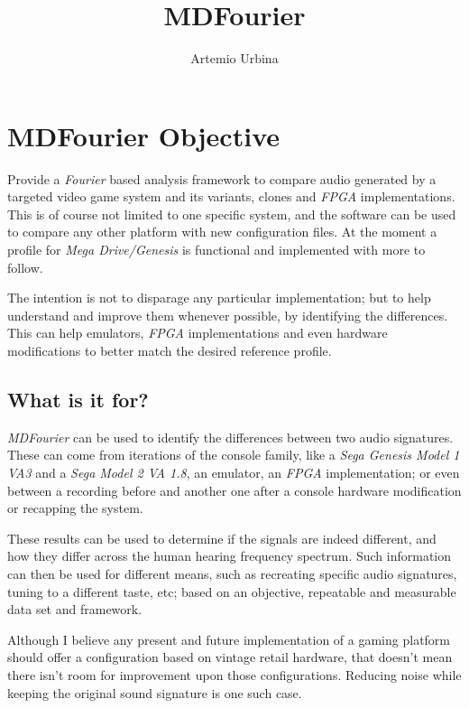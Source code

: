 \documentclass[10pt,a4paper]{report}
\title{MDFourier}
\author{Artemio Urbina}
\begin{document}
\begin{titlepage}
	\maketitle
	\thispagestyle{empty}
\end{titlepage}

\tableofcontents

\chapter{MDFourier Objective}

Provide a \textit{Fourier} based analysis framework to compare audio generated by a targeted video game system and its variants, clones and \textit{FPGA} implementations. This is of course not limited to one specific system, and the software can be used to compare any other platform with new configuration files. At the moment a profile for \textit{Mega Drive/Genesis} is functional and implemented with more to follow.

The intention is not to disparage any particular implementation; but to help understand and improve them whenever possible, by identifying the differences. This can help emulators, \textit{FPGA} implementations and even hardware modifications to better match the desired reference profile.

\section{What is it for?}

\textit{MDFourier} can be used to identify the differences between two audio signatures. These can come from iterations of the console family, like a \textit{Sega Genesis Model 1 VA3} and a \textit{Sega Model 2 VA 1.8}, an emulator, an \textit{FPGA} implementation; or even between a recording before and another one after a console hardware modification or recapping the system.

These results can be used to determine if the signals are indeed different, and how they differ across the human hearing frequency spectrum. Such information can then be used for different means, such as recreating specific audio signatures, tuning to a different taste, etc; based on an objective, repeatable and measurable data set and framework.

Although I believe any present and future implementation of a gaming platform should offer a configuration based on vintage retail hardware, that doesn't mean there isn't room for improvement upon those configurations. Reducing noise while keeping the original sound signature is one such case.
\end{document}
